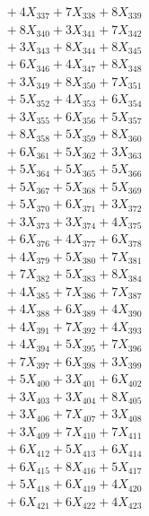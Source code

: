 \documentclass[a4paper,10pt]{article}
\begin{document}
{\begin{align}
&\;  + 4 X_{337} + 7 X_{338} + 8 X_{339} \\[0.5ex]\allowbreak
&\;  + 8 X_{340} + 3 X_{341} + 7 X_{342} \\[0.3ex]
&\;  + 3 X_{343} + 8 X_{344} + 8 X_{345} \\[0.3ex]
&\;  + 6 X_{346} + 4 X_{347} + 8 X_{348} \\[0.3ex]
&\;  + 3 X_{349} + 8 X_{350} + 7 X_{351} \\[0.3ex]
&\;  + 5 X_{352} + 4 X_{353} + 6 X_{354} \\[0.3ex]
&\;  + 3 X_{355} + 6 X_{356} + 5 X_{357} \\[0.3ex]
&\;  + 8 X_{358} + 5 X_{359} + 8 X_{360} \\[0.3ex]
&\;  + 6 X_{361} + 5 X_{362} + 3 X_{363} \\[0.3ex]
&\;  + 5 X_{364} + 5 X_{365} + 5 X_{366} \\[0.3ex]
&\;  + 5 X_{367} + 5 X_{368} + 5 X_{369} \\[0.5ex]\allowbreak
&\;  + 5 X_{370} + 6 X_{371} + 3 X_{372} \\[0.3ex]
&\;  + 3 X_{373} + 3 X_{374} + 4 X_{375} \\[0.3ex]
&\;  + 6 X_{376} + 4 X_{377} + 6 X_{378} \\[0.3ex]
&\;  + 4 X_{379} + 5 X_{380} + 7 X_{381} \\[0.3ex]
&\;  + 7 X_{382} + 5 X_{383} + 8 X_{384} \\[0.3ex]
&\;  + 4 X_{385} + 7 X_{386} + 7 X_{387} \\[0.3ex]
&\;  + 4 X_{388} + 6 X_{389} + 4 X_{390} \\[0.3ex]
&\;  + 4 X_{391} + 7 X_{392} + 4 X_{393} \\[0.3ex]
&\;  + 4 X_{394} + 5 X_{395} + 7 X_{396} \\[0.3ex]
&\;  + 7 X_{397} + 6 X_{398} + 3 X_{399} \\[0.5ex]\allowbreak
&\;  + 5 X_{400} + 3 X_{401} + 6 X_{402} \\[0.3ex]
&\;  + 3 X_{403} + 3 X_{404} + 8 X_{405} \\[0.3ex]
&\;  + 3 X_{406} + 7 X_{407} + 3 X_{408} \\[0.3ex]
&\;  + 3 X_{409} + 7 X_{410} + 7 X_{411} \\[0.3ex]
&\;  + 6 X_{412} + 5 X_{413} + 6 X_{414} \\[0.3ex]
&\;  + 6 X_{415} + 8 X_{416} + 5 X_{417} \\[0.3ex]
&\;  + 5 X_{418} + 6 X_{419} + 4 X_{420} \\[0.3ex]
&\;  + 6 X_{421} + 6 X_{422} + 4 X_{423} \\[0.3ex]

\end{align}}
\end{document}
